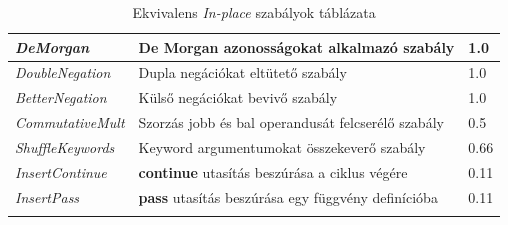 \begin{center}
\begin{longtable}{ | p{} | p{} | p{} | }
		\emph{DeMorgan}
		& De Morgan azonosságokat alkalmazó szabály
		& 1.0
		\\ \hline

		\emph{DoubleNegation}
		& Dupla negációkat eltütető szabály
		& 1.0
		\\ \hline

		\emph{BetterNegation}
		& Külső negációkat bevivő szabály
		& 1.0
		\\ \hline

		\emph{CommutativeMult}
		& Szorzás jobb és bal operandusát felcserélő szabály
		& 0.5
		\\ \hline

		\emph{ShuffleKeywords}
		& Keyword argumentumokat összekeverő szabály
		& 0.66
		\\ \hline

		\emph{InsertContinue}
		& \textbf{continue} utasítás beszúrása a ciklus végére
		& 0.11
		\\ \hline

		\emph{InsertPass}
		& \textbf{pass} utasítás beszúrása egy függvény definícióba
		& 0.11
		\\ \hline

		\caption{Ekvivalens \emph{In-place} szabályok táblázata}
		\label{tab:in-place-rules-eqv}
	\end{longtable}
\end{center}

